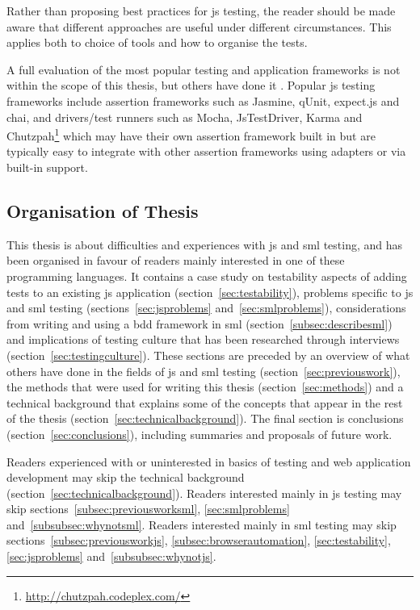 \documentclass[11pt]{article}
\begin{document}
Rather than proposing best practices for \gls{js} testing, the reader should be made aware that different approaches are useful under different circumstances. This applies both to choice of tools and how to organise the tests.

A full evaluation of the most popular testing and application frameworks is not within the scope of this thesis, but others have done it \cite{JackFranklin}\cite{SebastianPorto}. Popular \gls{js} testing frameworks include assertion frameworks such as Jasmine, qUnit, expect.js and chai, and drivers/test runners such as Mocha, JsTestDriver, Karma and Chutzpah\footnote{\url{http://chutzpah.codeplex.com/}} which may have their own assertion framework built in but are typically easy to integrate with other assertion frameworks using adapters or via built-in support.

\subsection{Organisation of Thesis}

This thesis is about difficulties and experiences with \gls{js} and \gls{sml} testing, and has been organised in favour of readers mainly interested in one of these programming languages. It contains a case study on testability aspects of adding tests to an existing \gls{js} application (section~\ref{sec:testability}), problems specific to \gls{js} and \gls{sml} testing (sections~\ref{sec:jsproblems} and~\ref{sec:smlproblems}), considerations from writing and using a \gls{bdd} framework in \gls{sml} (section~\ref{subsec:describesml}) and implications of testing culture that has been researched through interviews (section~\ref{sec:testingculture}). These sections are preceded by an overview of what others have done in the fields of \gls{js} and \gls{sml} testing (section~\ref{sec:previouswork}), the methods that were used for writing this thesis (section~\ref{sec:methods}) and a technical background that explains some of the concepts that appear in the rest of the thesis (section~\ref{sec:technicalbackground}). The final section is conclusions (section~\ref{sec:conclusions}), including summaries and proposals of future work.

Readers experienced with or uninterested in basics of testing and web application development may skip the technical background (section~\ref{sec:technicalbackground}). Readers interested mainly in \gls{js} testing may skip sections~\ref{subsec:previousworksml}, \ref{sec:smlproblems} and~\ref{subsubsec:whynotsml}. Readers interested mainly in \gls{sml} testing may skip sections~\ref{subsec:previousworkjs}, \ref{subsec:browserautomation}, \ref{sec:testability}, \ref{sec:jsproblems} and~\ref{subsubsec:whynotjs}.
\end{document}
